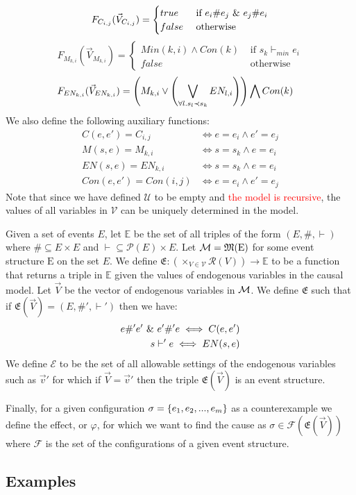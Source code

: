$$
    F_{C_{i,j}}(\vec V_{C_{i,j}}) = \begin{cases}
        true  & \text{ if } e_i \# e_j \ \& \  e_j \# e_i \\
        false & \text{ otherwise }
    \end{cases}
$$
$$
    F_{M_{k,i}}(\vec V_{M_{k,i}}) = \begin{cases}
       Min(k,i) \wedge Con(k) & \text{ if } s_k \vdash_{min} e_i \\
        false  & \text{ otherwise }
    \end{cases}
$$
\begin{align*}
    F_{EN_{k,i}}(\vec V_{EN_{k,i}}) & =
    \left(
    M_{k,i} \vee
    \left(
    \bigvee_{\forall l. s_l  \prec s_k}EN_{l,i}
    \right)
    \right)
    \bigwedge
    Con(k)
\end{align*}
We also define the following auxiliary functions:
\begin{align*}
    C(e,e') = C_{i,j}    & \iff e = e_i \wedge e' = e_j \\
    M(s,e)  = M_{k,i}    & \iff s = s_k \wedge e = e_i  \\
    EN(s,e)  = EN_{k,i}  & \iff s = s_k \wedge e = e_i  \\
    Con(e,e') = Con(i,j) & \iff e = e_i \wedge e' = e_j
\end{align*}
Note that since we have defined $\mathcal{U}$ to be empty and
\textcolor{red}{the model is recursive}, the values of all variables in
$\mathcal{V}$ can be uniquely determined in the model.

Given a set of events $E$, let $\mathbb{E}$ be the set of all
triples of the form $(E,\#,\vdash)$ where $\# \subseteq E \times E$ 
and $\vdash \subseteq \mathcal{P}(E) \times E$.
Let $\mathcal{M} = \mathfrak{M}(\mathrm{E})$ for some event structure
$\mathrm{E}$ on the set $E$.
We define $\mathfrak{E}: (\times_{V \in \mathcal{V}}\mathcal{R}(V)) \rightarrow \mathbb{E}$
to be a function that returns a triple in $\mathbb{E}$ given the
values of endogenous variables in the causal model.
Let $\vec V$ be the vector of endogenous variables in $\mathcal{M}$.
We define $\mathfrak{E}$ such that if
$\mathfrak{E}(\vec V) = (E,\#',\vdash')$ then we have:
\begin{align*}
    e \#' e' \ \& \  e' \#' e \iff C(e,e') \\
    s \vdash' e \iff EN(s,e)
\end{align*}
We define $\mathcal{E}$ to be the set of all allowable
settings of the endogenous variables such as $\vec v'$ 
for which if $\vec V = \vec v'$ then the triple 
$\mathfrak{E}(\vec V)$ is an event structure.

Finally, for a given configuration $\sigma = \{e_1,e_2,...,e_m\}$ 
as a counterexample we define the effect, or $\varphi$, for which 
we want to find the cause as 
$\sigma \in \mathcal{F}(\mathfrak{E}(\vec V))$ where $\mathcal{F}$ 
is the set of the configurations of a given event structure.
\pagebreak
\subsection{Examples}
